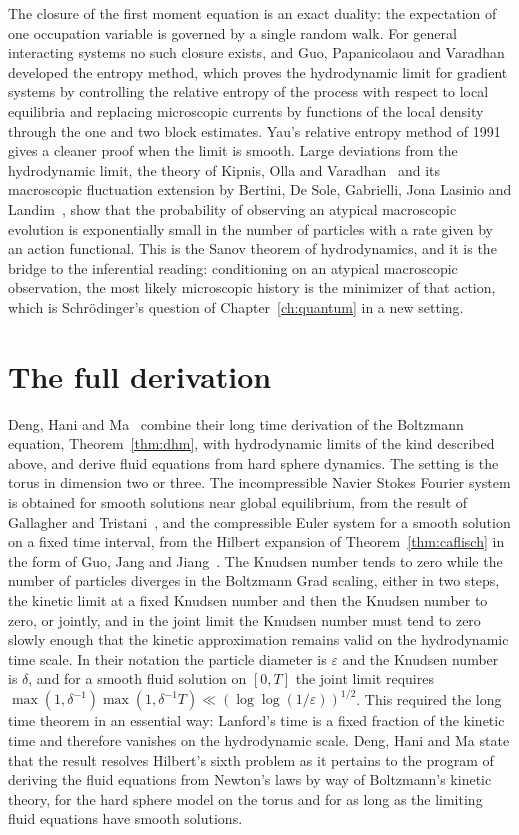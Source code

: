 The closure of the first moment equation is an exact duality: the expectation of one occupation variable is governed by a single random walk. For general interacting systems no such closure exists, and Guo, Papanicolaou and Varadhan~\cite{gpv1988} developed the entropy method, which proves the hydrodynamic limit for gradient systems by controlling the relative entropy of the process with respect to local equilibria and replacing microscopic currents by functions of the local density through the one and two block estimates. Yau's relative entropy method of 1991~\cite{yau1991} gives a cleaner proof when the limit is smooth. Large deviations from the hydrodynamic limit, the theory of Kipnis, Olla and Varadhan~\cite{kipnis1989} and its macroscopic fluctuation extension by Bertini, De Sole, Gabrielli, Jona Lasinio and Landim~\cite{bertini2015}, show that the probability of observing an atypical macroscopic evolution is exponentially small in the number of particles with a rate given by an action functional. This is the Sanov theorem of hydrodynamics, and it is the bridge to the inferential reading: conditioning on an atypical macroscopic observation, the most likely microscopic history is the minimizer of that action, which is Schr\"odinger's question of Chapter~\ref{ch:quantum} in a new setting.

\section{The full derivation}

Deng, Hani and Ma~\cite{denghanima2025} combine their long time derivation of the Boltzmann equation, Theorem~\ref{thm:dhm}, with hydrodynamic limits of the kind described above, and derive fluid equations from hard sphere dynamics. The setting is the torus in dimension two or three. The incompressible Navier Stokes Fourier system is obtained for smooth solutions near global equilibrium, from the result of Gallagher and Tristani~\cite{gallaghertristani2020}, and the compressible Euler system for a smooth solution on a fixed time interval, from the Hilbert expansion of Theorem~\ref{thm:caflisch} in the form of Guo, Jang and Jiang~\cite{guojangjiang2009}. The Knudsen number tends to zero while the number of particles diverges in the Boltzmann Grad scaling, either in two steps, the kinetic limit at a fixed Knudsen number and then the Knudsen number to zero, or jointly, and in the joint limit the Knudsen number must tend to zero slowly enough that the kinetic approximation remains valid on the hydrodynamic time scale. In their notation the particle diameter is $\varepsilon$ and the Knudsen number is $\delta$, and for a smooth fluid solution on $[0,T]$ the joint limit requires $\max(1,\delta^{-1})\max(1,\delta^{-1}T)\ll(\log\log(1/\varepsilon))^{1/2}$. This required the long time theorem in an essential way: Lanford's time is a fixed fraction of the kinetic time and therefore vanishes on the hydrodynamic scale. Deng, Hani and Ma state that the result resolves Hilbert's sixth problem as it pertains to the program of deriving the fluid equations from Newton's laws by way of Boltzmann's kinetic theory, for the hard sphere model on the torus and for as long as the limiting fluid equations have smooth solutions.

